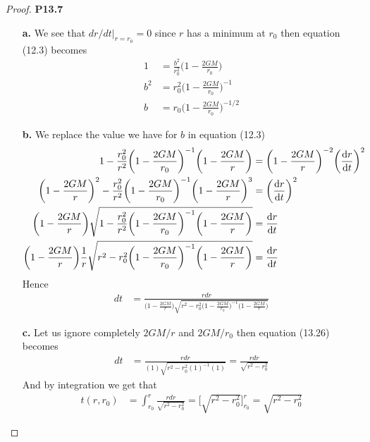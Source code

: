 \documentclass[11pt]{article}
\theoremstyle{definition}
\begin{document}
\cleardoublepage
\begin{proof}{\textbf{P13.7}}
\begin{itemize}
\item [\textbf{a.}] We see that $dr/dt|_{r=r_0} = 0$ since $r$ has a
minimum at $r_0$ then equation (12.3) becomes
\begin{align*}
    1 &= \frac{b^2}{r_0^2}\bigg(1 - \frac{2GM}{r_0}\bigg)\\
    b^2 &= r_0^2\bigg(1 - \frac{2GM}{r_0}\bigg)^{-1}\\
    b &= r_0\bigg(1 - \frac{2GM}{r_0}\bigg)^{-1/2}
\end{align*}
\item [\textbf{b.}] We replace the value we have for $b$ in equation (12.3)
\begin{align*}
    1 - \frac{r_0^2}{r^2}\bigg(1 - \frac{2GM}{r_0}\bigg)^{-1}\bigg(1 - \frac{2GM}{r}\bigg)
    &= \bigg(1 - \frac{2GM}{r}\bigg)^{-2}\bigg(\dv{r}{t}\bigg)^2\\
    \bigg(1 - \frac{2GM}{r}\bigg)^{2}
    - \frac{r_0^2}{r^2}\bigg(1 - \frac{2GM}{r_0}\bigg)^{-1}\bigg(1 - \frac{2GM}{r}\bigg)^{3}
    &= \bigg(\dv{r}{t}\bigg)^2\\
    \bigg(1 - \frac{2GM}{r}\bigg)\sqrt{
    1 - \frac{r_0^2}{r^2}\bigg(1 - \frac{2GM}{r_0}\bigg)^{-1}\bigg(1 - \frac{2GM}{r}\bigg)}
    &= \dv{r}{t}\\
    \bigg(1 - \frac{2GM}{r}\bigg)\frac{1}{r}\sqrt{
    r^2 - r_0^2\bigg(1 - \frac{2GM}{r_0}\bigg)^{-1}\bigg(1 - \frac{2GM}{r}\bigg)}
    &= \dv{r}{t}
\end{align*}
Hence
\begin{align*}
    dt &= \frac{rdr}{\bigg(1 - \frac{2GM}{r}\bigg)\sqrt{
    r^2 - r_0^2\bigg(1 - \frac{2GM}{r_0}\bigg)^{-1}\bigg(1 - \frac{2GM}{r}\bigg)}}
\end{align*}
\item [\textbf{c.}] Let us ignore completely $2GM/r$ and $2GM/r_0$ then
equation (13.26) becomes
\begin{align*}
    dt &= \frac{rdr}{(1)\sqrt{r^2 - r_0^2(1)^{-1}(1)}} = \frac{rdr}{\sqrt{r^2 - r_0^2}}
\end{align*}
And by integration we get that
\begin{align*}
    t(r,r_0) &= \int_{r_0}^r \frac{rdr}{\sqrt{r^2 - r_0^2}}
    = \bigg[\sqrt{r^2 - r_0^2}\bigg]_{r_0}^r
    =\sqrt{r^2 - r_0^2}
\end{align*}


\end{itemize}
\end{proof}
\end{document}
